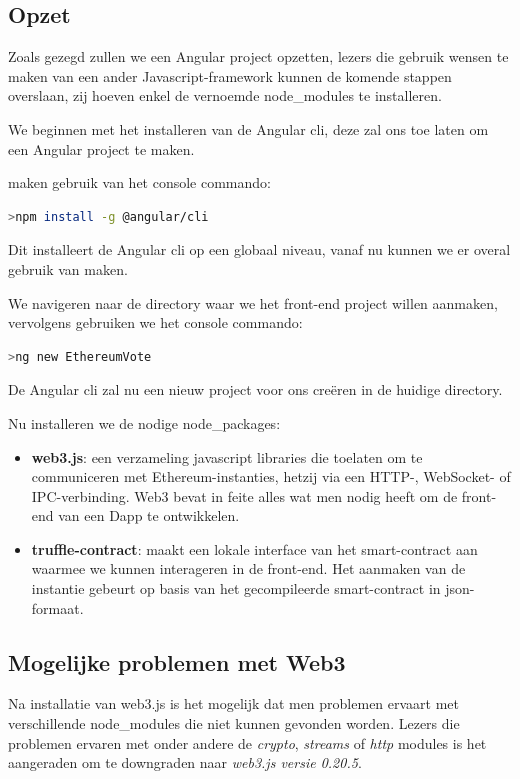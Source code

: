 	\subsection{Opzet}
	Zoals gezegd zullen we een Angular project opzetten, lezers die gebruik wensen te maken van een ander Javascript-framework kunnen de komende stappen overslaan, zij hoeven enkel de vernoemde node\_modules te installeren. 
	
	We beginnen met het installeren van de Angular cli, deze zal ons toe laten om een Angular project te maken.
	
	maken gebruik van het console commando:
	\begin{lstlisting}[numbers=none,language=bash]
	>npm install -g @angular/cli
	\end{lstlisting}
	Dit installeert de Angular cli op een globaal niveau, vanaf nu kunnen we er overal gebruik van maken.
	
	We navigeren naar de directory waar we het front-end project willen aanmaken, vervolgens gebruiken we het console commando:
	\begin{lstlisting}[numbers=none,language=bash]
	>ng new EthereumVote
	\end{lstlisting}
	De Angular cli zal nu een nieuw project voor ons creëren in de huidige directory. 
	
	Nu installeren we de nodige node\_packages:
	\begin{itemize}
		\item \textbf{web3.js}: een verzameling javascript libraries  die toelaten om te communiceren met Ethereum-instanties, hetzij via  een HTTP-, WebSocket- of IPC-verbinding. Web3 bevat in feite alles wat men nodig heeft om de front-end van een Dapp te ontwikkelen.
		\item \textbf{truffle-contract}: maakt een lokale interface van het smart-contract aan waarmee we kunnen interageren in de front-end. Het aanmaken van de instantie gebeurt op basis van het gecompileerde smart-contract in json-formaat.
	\end{itemize}

	\subsection{Mogelijke problemen met Web3}
	
	Na installatie van web3.js is het mogelijk dat men problemen ervaart met verschillende node\_modules die niet kunnen gevonden worden. Lezers die problemen ervaren met onder andere de \textit{crypto}, \textit{streams} of \textit{http } modules is het aangeraden om te downgraden naar \textit{web3.js versie 0.20.5}. 
	
